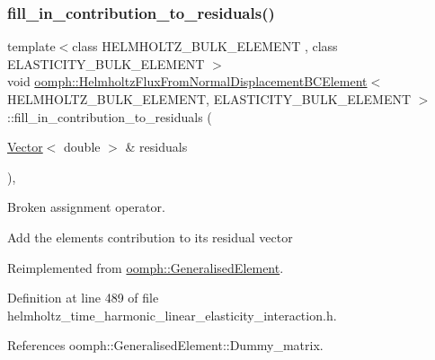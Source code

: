 \subsubsection{\texorpdfstring{fill\+\_\+in\+\_\+contribution\+\_\+to\+\_\+residuals()}{fill\_in\_contribution\_to\_residuals()}}
{\footnotesize\ttfamily template$<$class H\+E\+L\+M\+H\+O\+L\+T\+Z\+\_\+\+B\+U\+L\+K\+\_\+\+E\+L\+E\+M\+E\+NT , class E\+L\+A\+S\+T\+I\+C\+I\+T\+Y\+\_\+\+B\+U\+L\+K\+\_\+\+E\+L\+E\+M\+E\+NT $>$ \\
void \hyperlink{classoomph_1_1HelmholtzFluxFromNormalDisplacementBCElement}{oomph\+::\+Helmholtz\+Flux\+From\+Normal\+Displacement\+B\+C\+Element}$<$ H\+E\+L\+M\+H\+O\+L\+T\+Z\+\_\+\+B\+U\+L\+K\+\_\+\+E\+L\+E\+M\+E\+NT, E\+L\+A\+S\+T\+I\+C\+I\+T\+Y\+\_\+\+B\+U\+L\+K\+\_\+\+E\+L\+E\+M\+E\+NT $>$\+::fill\+\_\+in\+\_\+contribution\+\_\+to\+\_\+residuals (\begin{DoxyParamCaption}\item[{\hyperlink{classoomph_1_1Vector}{Vector}$<$ double $>$ \&}]{residuals }\end{DoxyParamCaption})\hspace{0.3cm}{\ttfamily [inline]}, {\ttfamily [virtual]}}



Broken assignment operator. 

Add the element\textquotesingle{}s contribution to its residual vector 

Reimplemented from \hyperlink{classoomph_1_1GeneralisedElement_a310c97f515e8504a48179c0e72c550d7}{oomph\+::\+Generalised\+Element}.



Definition at line 489 of file helmholtz\+\_\+time\+\_\+harmonic\+\_\+linear\+\_\+elasticity\+\_\+interaction.\+h.



References oomph\+::\+Generalised\+Element\+::\+Dummy\+\_\+matrix.

\mbox{\label{classoomph_1_1HelmholtzFluxFromNormalDisplacementBCElement_a66f653fb85249296deb66cc91647cc52}} 
